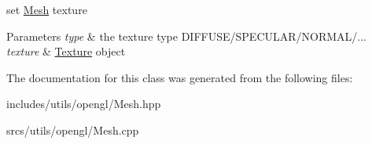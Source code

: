 set \hyperlink{class_mesh}{Mesh} texture 


\begin{DoxyParams}{Parameters}
{\em type} & the texture type D\+I\+F\+F\+U\+S\+E/\+S\+P\+E\+C\+U\+L\+A\+R/\+N\+O\+R\+M\+A\+L/... \\
\hline
{\em texture} & \hyperlink{struct_texture}{Texture} object \\
\hline
\end{DoxyParams}


The documentation for this class was generated from the following files\+:\begin{DoxyCompactItemize}
\item 
includes/utils/opengl/Mesh.\+hpp\item 
srcs/utils/opengl/Mesh.\+cpp\end{DoxyCompactItemize}
